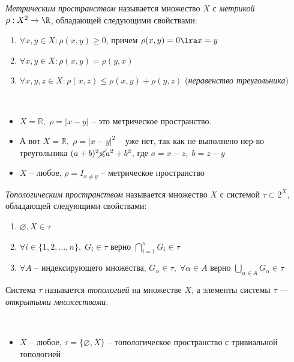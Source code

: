 \begin{definition}
	\textit{Метрическим пространством} называется множество $X$ с \textit{метрикой} \\
    $\rho : X^2 \to \R$, обладающей следующими свойствами:
	\begin{enumerate}
		\item $\forall x, y \in X: \rho(x, y) \geqslant 0$, причем $\rho(x, y) = 0 \lra x = y$
		\item $\forall x, y \in X: \rho(x, y) = \rho(y, x)$
		\item $\forall x, y, z \in X: \rho(x, z) \leqslant \rho(x, y) + \rho(y, z)$ (\textit{неравенство треугольника})
	\end{enumerate}
\end{definition}

\begin{example}~
\begin{itemize}
    \item $X = \mathbb{R}, \; \rho = |x - y|$ -- это метрическое пространство. 
    \item А вот $X = \mathbb{R}, \; \rho = |x - y|^2$ -- уже нет, так как не выполнено нер-во треугольника $(a + b)^2  \cancel{\leqslant}a^2 + b^2 $, где $a=x-z, \; b=z-y$

    \item $X$ -- любое, $\rho = I_{x \neq y}$ -- метрическое пространство 
\end{itemize}
\end{example}

\begin{definition}
	\textit{Топологическим пространством} называется множество $X$ с системой $\tau \subset 2^X$, обладающей следующими свойствами:
	\begin{enumerate}
		\item $\varnothing, X \in \tau$
		\item $\forall i \in \{1, 2, \ldots, n\}, \;G_i \in \tau $ верно $\bigcap\limits_{i=1}^{n} G_i \in \tau$
		\item $\forall A $ -- индексирующего множества, $G_\alpha \in \tau, \; \forall \alpha \in A$  верно $ \bigcup\limits_{\alpha \in A}G_\alpha\in \tau$
	\end{enumerate}
	
	Система $\tau$ называется \textit{топологией} на множестве $X$, а элементы системы $\tau$ --- \textit{открытыми множествами}.
\end{definition}

\begin{example}~
\begin{itemize}
    \item $X$ -- любое, $\tau = \{\varnothing, X\}$ -- топологическое пространство с тривиальной топологией
\end{itemize}
\end{example}


